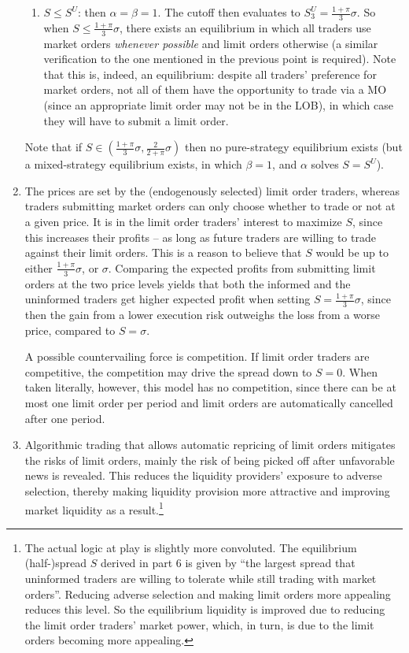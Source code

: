 \documentclass[a4paper]{article}
\begin{document}
\begin{enumerate}
\begin{enumerate}
		\item $S \leq S^U$: then $\alpha=\beta=1$. The cutoff then evaluates to $S^U_3 = \frac{1+\pi}{3}\sigma$. So when $S \leq \frac{1+\pi}{3}\sigma$, there exists an equilibrium in which all traders use market orders \emph{whenever possible} and limit orders otherwise (a similar verification to the one mentioned in the previous point is required). 
		Note that this is, indeed, an equilibrium: despite all traders' preference for market orders, not all of them have the opportunity to trade via a MO (since an appropriate limit order may not be in the LOB), in which case they will have to submit a limit order.
	\end{enumerate}
	Note that if $S \in \left( \frac{1+\pi}{3}\sigma, \frac{2}{2+\pi} \sigma \right)$ then no pure-strategy equilibrium exists (but a mixed-strategy equilibrium exists, in which $\beta = 1$, and $\alpha$ solves $S = S^U$).
	
	\item The prices are set by the (endogenously selected) limit order traders, whereas traders submitting market orders can only choose whether to trade or not at a given price. It is in the limit order traders' interest to maximize $S$, since this increases their profits -- as long as future traders are willing to trade against their limit orders. This is a reason to believe that $S$ would be up to either $\frac{1+\pi}{3}\sigma$, or $\sigma$. Comparing the expected profits from submitting limit orders at the two price levels yields that both the informed and the uninformed traders get higher expected profit when setting $S=\frac{1+\pi}{3}\sigma$, since then the gain from a lower execution risk outweighs the loss from a worse price, compared to $S=\sigma$.
	
	A possible countervailing force is competition. If limit order traders are competitive, the competition may drive the spread down to $S = 0$. When taken literally, however, this model has no competition, since there can be at most one limit order per period and limit orders are automatically cancelled after one period.
	
	\item Algorithmic trading that allows automatic repricing of limit orders mitigates the risks of limit orders, mainly the risk of being picked off after unfavorable news is revealed. This reduces the liquidity providers' exposure to adverse selection, thereby making liquidity provision more attractive and improving market liquidity as a result.\footnote{The actual logic at play is slightly more convoluted. The equilibrium (half-)spread $S$ derived in part 6 is given by ``the largest spread that uninformed traders are willing to tolerate while still trading with market orders''. Reducing adverse selection and making limit orders more appealing reduces this level. So the equilibrium liquidity is improved due to reducing the limit order traders' market power, which, in turn, is due to the limit orders becoming more appealing.}
\end{enumerate}
\fi
\end{document}
